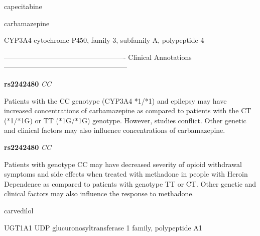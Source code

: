 \documentclass{resume} %
\begin{document}
\begin{rSection}{ capecitabine }
\end{rSection}\begin{rSection}{ carbamazepine }
\item[]

\begin{rSubsection}{ CYP3A4 }{ cytochrome P450, family 3, subfamily A, polypeptide 4 }{}{}
\item[]

\item[] ---------------------------------------------------- Clinical Annotations -----------------------------------------------------\newline
\item \textbf{ rs2242480 } \textit{ CC }
\item[] Patients with the CC genotype (CYP3A4 *1/*1) and epilepsy may have increased concentrations of carbamazepine as compared to patients with the CT (*1/*1G) or TT (*1G/*1G) genotype. However, studies conflict. Other genetic and clinical factors may also influence concentrations of carbamazepine.\item \textbf{ rs2242480 } \textit{ CC }
\item[] Patients with genotype CC may have decreased severity of opioid withdrawal symptoms and side effects when treated with methadone in people with Heroin Dependence as compared to patients with genotype TT or CT. Other genetic and clinical factors may also influence the response to methadone.
\end{rSubsection}

\end{rSection}\begin{rSection}{ carvedilol }
\item[]

\begin{rSubsection}{ UGT1A1 }{ UDP glucuronosyltransferase 1 family, polypeptide A1 }{}{}
\item[]


\end{rSubsection}
\end{rSection}
\end{document}
